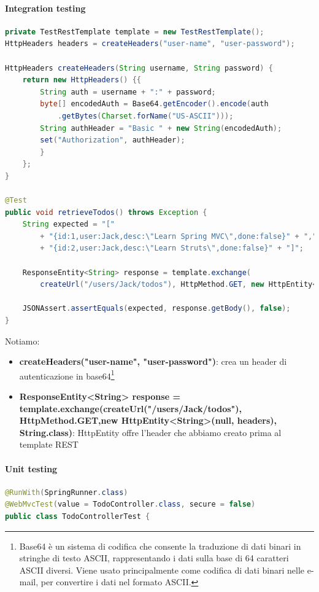 \documentclass[11pt,a4paper]{book}
\begin{document}
\paragraph{Integration testing}
\begin{lstlisting}[language = Java]
private TestRestTemplate template = new TestRestTemplate();
HttpHeaders headers = createHeaders("user-name", "user-password");

HttpHeaders createHeaders(String username, String password) {
	return new HttpHeaders() {{
		String auth = username + ":" + password;
		byte[] encodedAuth = Base64.getEncoder().encode(auth
			.getBytes(Charset.forName("US-ASCII")));
		String authHeader = "Basic " + new String(encodedAuth);
		set("Authorization", authHeader);
		}
	};
}

@Test
public void retrieveTodos() throws Exception {
	String expected = "["
		+ "{id:1,user:Jack,desc:\"Learn Spring MVC\",done:false}" + ","
		+ "{id:2,user:Jack,desc:\"Learn Struts\",done:false}" + "]";
	
	ResponseEntity<String> response = template.exchange(
		createUrl("/users/Jack/todos"), HttpMethod.GET, new HttpEntity<String>(null, headers), String.class);

	JSONAssert.assertEquals(expected, response.getBody(), false);
}
\end{lstlisting}

Notiamo:
\begin{itemize}
	\item \textbf{createHeaders("user-name", "user-password")}: crea un header di autenticazione in base64\footnote{Base64 è un sistema di codifica che consente la traduzione di dati binari in stringhe di testo ASCII, rappresentando i dati sulla base di 64 caratteri ASCII diversi. Viene usato principalmente come codifica di dati binari nelle e-mail, per convertire i dati nel formato ASCII.}
	\item \textbf{ResponseEntity<String> response =	
		template.exchange(createUrl("/users/Jack/todos"),
		HttpMethod.GET,new HttpEntity<String>(null, headers),
		String.class)}: HttpEntity offre l'header che abbiamo creato prima al template REST
\end{itemize}	

\paragraph{Unit testing}
\begin{lstlisting}[language = Java]
@RunWith(SpringRunner.class)
@WebMvcTest(value = TodoController.class, secure = false)
public class TodoControllerTest {
\end{lstlisting}
\end{document}
